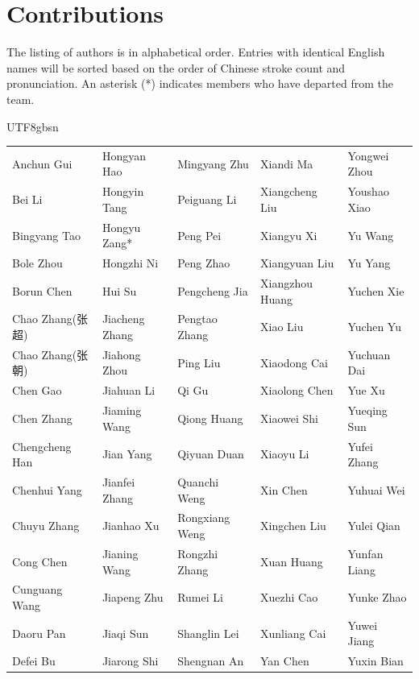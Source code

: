 \section*{Contributions}

The listing of authors is in alphabetical order.
Entries with identical English names will be sorted based on the order of Chinese stroke count and pronunciation. An asterisk (*) indicates members who have departed from the team.



\begin{CJK}{UTF8}{gbsn}

\begin{center}

\begin{tabular}{p{}p{}p{}p{}p{}}
Anchun Gui & Hongyan Hao & Mingyang Zhu & Xiandi Ma & Yongwei Zhou \\
Bei Li & Hongyin Tang & Peiguang Li & Xiangcheng Liu & Youshao Xiao \\
Bingyang Tao & Hongyu Zang* & Peng Pei & Xiangyu Xi & Yu Wang \\
Bole Zhou & Hongzhi Ni & Peng Zhao & Xiangyuan Liu & Yu Yang \\
Borun Chen & Hui Su & Pengcheng Jia & Xiangzhou Huang & Yuchen Xie \\
Chao Zhang(张超) & Jiacheng Zhang & Pengtao Zhang & Xiao Liu & Yuchen Yu \\
Chao Zhang(张朝) & Jiahong Zhou & Ping Liu & Xiaodong Cai & Yuchuan Dai \\
Chen Gao & Jiahuan Li & Qi Gu & Xiaolong Chen & Yue Xu \\
Chen Zhang & Jiaming Wang & Qiong Huang & Xiaowei Shi & Yueqing Sun \\
Chengcheng Han & Jian Yang & Qiyuan Duan & Xiaoyu Li & Yufei Zhang \\
Chenhui Yang & Jianfei Zhang & Quanchi Weng & Xin Chen & Yuhuai Wei \\
Chuyu Zhang & Jianhao Xu & Rongxiang Weng & Xingchen Liu & Yulei Qian \\
Cong Chen & Jianing Wang & Rongzhi Zhang & Xuan Huang & Yunfan Liang \\
Cunguang Wang & Jiapeng Zhu & Rumei Li & Xuezhi Cao & Yunke Zhao \\
Daoru Pan & Jiaqi Sun & Shanglin Lei & Xunliang Cai & Yuwei Jiang \\
Defei Bu & Jiarong Shi & Shengnan An & Yan Chen & Yuxin Bian \\

\end{tabular}
\end{center}
\end{CJK}
